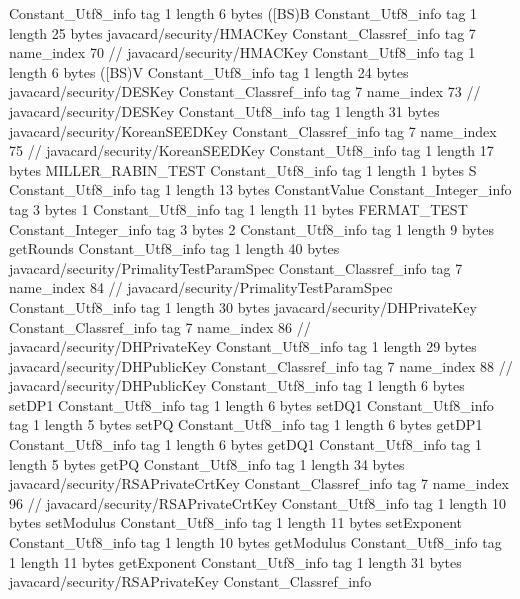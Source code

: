 {{{		}
		Constant_Utf8_info {
			tag	1
			length	6
			bytes	([BS)B
		}
		Constant_Utf8_info {
			tag	1
			length	25
			bytes	javacard/security/HMACKey
		}
		Constant_Classref_info {
			tag	7
			name_index	70		// javacard/security/HMACKey
		}
		Constant_Utf8_info {
			tag	1
			length	6
			bytes	([BS)V
		}
		Constant_Utf8_info {
			tag	1
			length	24
			bytes	javacard/security/DESKey
		}
		Constant_Classref_info {
			tag	7
			name_index	73		// javacard/security/DESKey
		}
		Constant_Utf8_info {
			tag	1
			length	31
			bytes	javacard/security/KoreanSEEDKey
		}
		Constant_Classref_info {
			tag	7
			name_index	75		// javacard/security/KoreanSEEDKey
		}
		Constant_Utf8_info {
			tag	1
			length	17
			bytes	MILLER_RABIN_TEST
		}
		Constant_Utf8_info {
			tag	1
			length	1
			bytes	S
		}
		Constant_Utf8_info {
			tag	1
			length	13
			bytes	ConstantValue
		}
		Constant_Integer_info {
			tag	3
			bytes	1
		}
		Constant_Utf8_info {
			tag	1
			length	11
			bytes	FERMAT_TEST
		}
		Constant_Integer_info {
			tag	3
			bytes	2
		}
		Constant_Utf8_info {
			tag	1
			length	9
			bytes	getRounds
		}
		Constant_Utf8_info {
			tag	1
			length	40
			bytes	javacard/security/PrimalityTestParamSpec
		}
		Constant_Classref_info {
			tag	7
			name_index	84		// javacard/security/PrimalityTestParamSpec
		}
		Constant_Utf8_info {
			tag	1
			length	30
			bytes	javacard/security/DHPrivateKey
		}
		Constant_Classref_info {
			tag	7
			name_index	86		// javacard/security/DHPrivateKey
		}
		Constant_Utf8_info {
			tag	1
			length	29
			bytes	javacard/security/DHPublicKey
		}
		Constant_Classref_info {
			tag	7
			name_index	88		// javacard/security/DHPublicKey
		}
		Constant_Utf8_info {
			tag	1
			length	6
			bytes	setDP1
		}
		Constant_Utf8_info {
			tag	1
			length	6
			bytes	setDQ1
		}
		Constant_Utf8_info {
			tag	1
			length	5
			bytes	setPQ
		}
		Constant_Utf8_info {
			tag	1
			length	6
			bytes	getDP1
		}
		Constant_Utf8_info {
			tag	1
			length	6
			bytes	getDQ1
		}
		Constant_Utf8_info {
			tag	1
			length	5
			bytes	getPQ
		}
		Constant_Utf8_info {
			tag	1
			length	34
			bytes	javacard/security/RSAPrivateCrtKey
		}
		Constant_Classref_info {
			tag	7
			name_index	96		// javacard/security/RSAPrivateCrtKey
		}
		Constant_Utf8_info {
			tag	1
			length	10
			bytes	setModulus
		}
		Constant_Utf8_info {
			tag	1
			length	11
			bytes	setExponent
		}
		Constant_Utf8_info {
			tag	1
			length	10
			bytes	getModulus
		}
		Constant_Utf8_info {
			tag	1
			length	11
			bytes	getExponent
		}
		Constant_Utf8_info {
			tag	1
			length	31
			bytes	javacard/security/RSAPrivateKey
		}
		Constant_Classref_info {
}}}
